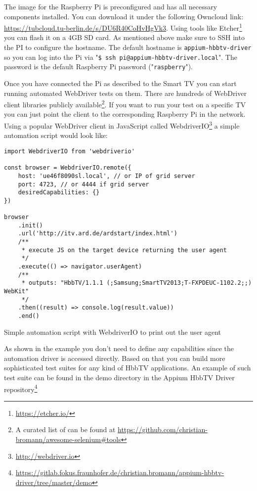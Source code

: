 The image for the Raspberry Pi is preconfigured and has all necessary components installed. You can download it under
the following Owncloud link: \url{https://tubcloud.tu-berlin.de/s/DU6R40CoHvHgVk3}. Using tools like Etcher\footnote{\url{https://etcher.io/}}
you can flash it on a 4GB SD card. As mentioned above make sure to SSH into the PI to configure the hostname. The
default hostname is \texttt{appium-hbbtv-driver} so you can log into the Pi via "\texttt{\$ ssh pi@appium-hbbtv-driver.local}".
The password is the default Raspberry Pi password ("\texttt{raspberry}").

Once you have connected the Pi as described to the Smart TV you can start running automated WebDriver tests on them.
There are hundreds of WebDriver client libraries publicly available\footnote{A curated list of can be found at
\url{https://github.com/christian-bromann/awesome-selenium\#tools}}. If you want to run your test on a specific TV
you can just point the client to the corresponding Raspberry Pi in the network. Using a popular WebDriver client in
JavaScript called WebdriverIO\footnote{\url{http://webdriver.io}} a simple automation script would look like:

\begin{listing}[H]
\begin{verbatim}
import WebdriverIO from 'webdriverio'

const browser = WebdriverIO.remote({
    host: 'ue46f8090sl.local', // or IP of grid server
    port: 4723, // or 4444 if grid server
    desiredCapabilities: {}
})

browser
    .init()
    .url('http://itv.ard.de/ardstart/index.html')
    /**
     * execute JS on the target device returning the user agent
     */
    .execute(() => navigator.userAgent)
    /**
     * outputs: "HbbTV/1.1.1 (;Samsung;SmartTV2013;T-FXPDEUC-1102.2;;) WebKit"
     */
    .then((result) => console.log(result.value))
    .end()
\end{verbatim}
\caption{Simple automation script with WebdriverIO to print out the user agent}
\label{lst:wdioExample}
\end{listing}

As shown in the example you don't need to define any capabilities since the automation driver is accessed directly.
Based on that you can build more sophisticated test suites for any kind of HbbTV applications. An example of such
test suite can be found in the demo directory in the Appium HbbTV Driver repository\footnote{\url{https://gitlab.fokus.fraunhofer.de/christian.bromann/appium-hbbtv-driver/tree/master/demo}}

